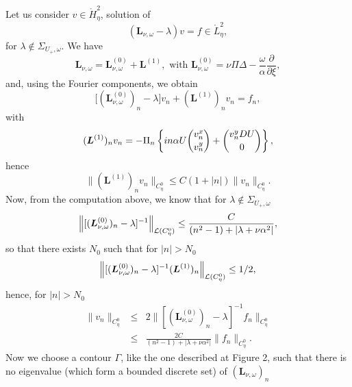 \documentclass[11pt]{article}
\begin{document}


Let us consider $v\in \mathring{H}_{\eta}^{2}$, solution of 
\begin{equation*}
(\boldsymbol{L}_{\nu ,\omega }-\lambda )v=f\in \mathring{L}_{\eta}^{2},
\end{equation*}%
for $\lambda \notin \Sigma _{U_+,\omega }$. We have%
\begin{equation*}
\boldsymbol{L}_{\nu ,\omega }=\boldsymbol{L}_{\nu ,\omega }^{(0)}+%
\boldsymbol{L}^{(1)},\text{ with }\boldsymbol{L}_{\nu ,\omega }^{(0)}=\nu
\Pi \Delta -\frac{\omega }{\alpha }\frac{\partial }{\partial \xi },
\end{equation*}%
and, using the Fourier components, we obtain%
\begin{equation*}
\lbrack (\boldsymbol{L}_{\nu ,\omega }^{(0)})_{n}-\lambda ]v_{n}+(%
\boldsymbol{L}^{(1)})_{n}v_{n}=f_{n},
\end{equation*}%
with%
\begin{equation*}
(\boldsymbol{L}^{(1)})_{n}v_{n}=-\Pi _{n}\left\{ in\alpha U\binom{v_{n}^{x}}{%
v_{n}^{y}}+\binom{v_{n}^{y}DU}{0}\right\} ,
\end{equation*}%
hence 
\begin{equation*}
\|(\boldsymbol{L}^{(1)})_{n}v_{n}\|_{C_{\eta}^{0}}\leq
C(1+|n|)\|v_{n}\|_{C_{\eta}^{0}}.
\end{equation*}%
Now, from the computation above, we know that for $\lambda \notin \Sigma
_{U_+,\omega }$ 
\begin{equation*}
\Bigl\|[(\boldsymbol{L}_{\nu ,\omega }^{(0)})_{n}-\lambda ]^{-1} \Bigr\|_{\mathcal{L}%
(C_{\eta}^{0})}\leq \frac{C}{(n^{2}-1)+|\lambda +\nu \alpha ^{2}|},
\end{equation*}%
so that there exists $N_{0}$ such that for $|n|>N_{0}$%
\begin{equation*}
\Bigl\|[(\boldsymbol{L}_{\nu ,\omega }^{(0)})_{n}-\lambda ]^{-1}(\boldsymbol{L}%
^{(1)})_{n} \Bigr\|_{\mathcal{L}(C_{\eta}^{0})}\leq 1/2,
\end{equation*}%
hence, for $|n|>N_{0}$%
\begin{eqnarray*}
\|v_{n}\|_{C_{\eta}^{0}} &\leq &2\|[(\boldsymbol{L}_{\nu ,\omega
}^{(0)})_{n}-\lambda ]^{-1}f_{n}\|_{C_{\eta}^{0}} \\
&\leq &\frac{2C}{(n^{2}-1)+|\lambda +\nu \alpha ^{2}|}\|f_{n}\|_{C_{\eta}^{0}}.
\end{eqnarray*}%
Now we choose a contour $\Gamma$, like the one described at Figure 2, such that there is no
eigenvalue (which form a bounded discrete set) of $(\boldsymbol{L}_{\nu ,\omega })_{n}$
\end{document}
